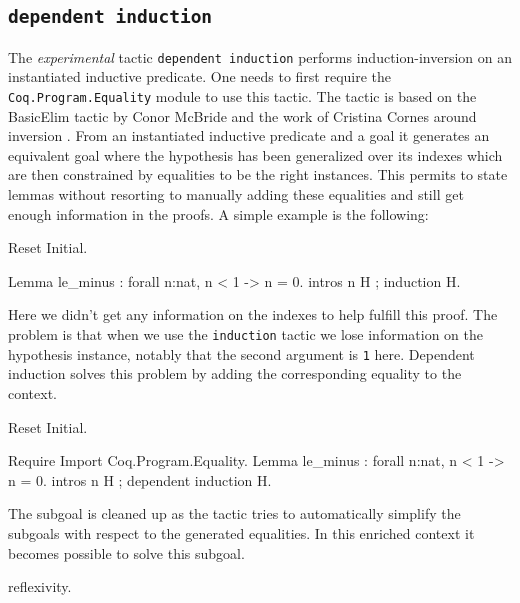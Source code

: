 \begin{coq_example*}
\subsection{\tt dependent induction \ident}
\label{DepInduction}

The \emph{experimental} tactic \texttt{dependent induction} performs
induction-inversion on an instantiated inductive predicate.
One needs to first require the {\tt Coq.Program.Equality} module to use
this tactic. The tactic is based on the BasicElim tactic by Conor
McBride \cite{DBLP:conf/types/McBride00} and the work of Cristina Cornes
around inversion \cite{DBLP:conf/types/CornesT95}. From an instantiated
inductive predicate and a goal it generates an equivalent goal where the
hypothesis has been generalized over its indexes which are then
constrained by equalities to be the right instances. This permits to
state lemmas without resorting to manually adding these equalities and
still get enough information in the proofs.
A simple example is the following:

\begin{coq_eval}
Reset Initial.
\end{coq_eval}
\begin{coq_example}
Lemma le_minus : forall n:nat, n < 1 -> n = 0.
intros n H ; induction H.
\end{coq_example}

Here we didn't get any information on the indexes to help fulfill this
proof. The problem is that when we use the \texttt{induction} tactic
we lose information on the hypothesis instance, notably that the second
argument is \texttt{1} here. Dependent induction solves this problem by
adding the corresponding equality to the context.

\begin{coq_eval}
Reset Initial.
\end{coq_eval}
\begin{coq_example}
Require Import Coq.Program.Equality.
Lemma le_minus : forall n:nat, n < 1 -> n = 0.
intros n H ; dependent induction H.
\end{coq_example}

The subgoal is cleaned up as the tactic tries to automatically
simplify the subgoals with respect to the generated equalities.
In this enriched context it becomes possible to solve this subgoal.
\begin{coq_example}
reflexivity.
\end{coq_example}


\end{coq_example*}
